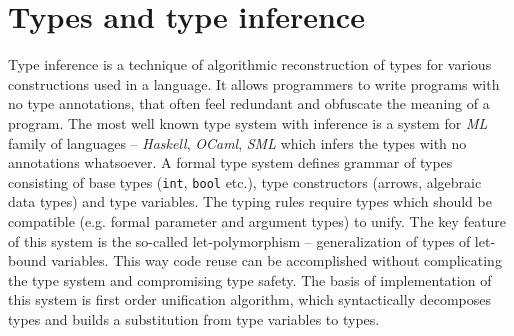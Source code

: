 \documentclass[inz, english, shortabstract]{iithesis}
\begin{document}
\section{Types and type inference}
Type inference is a technique of algorithmic reconstruction of types for various constructions used in a language.
It allows programmers to write programs with no type annotations, that often feel redundant and obfuscate the meaning of a program.
The most well known type system with inference is a system for \emph{ML} family of languages\cite{Pierce2002} -- \emph{Haskell}, \emph{OCaml}, \emph{SML} which infers the types with no annotations whatsoever.
A formal type system defines grammar of types consisting of base types (\texttt{int}, \texttt{bool} etc.), type constructors (arrows, algebraic data types) and type variables.
The typing rules require types which should be compatible (e.g. formal parameter and argument types) to unify.
The key feature of this system is the so-called let-polymorphism -- generalization of types of let-bound variables.
This way code reuse can be accomplished without complicating the type system and compromising type safety.
The basis of implementation of this system is first order unification algorithm\cite{Pierce2002}, which syntactically decomposes types and builds a substitution from type variables to types.
\end{document}
